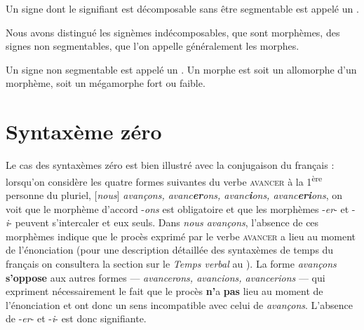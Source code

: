{Un signe dont le signifiant est décomposable sans être segmentable est appelé un .}

Nous avons distingué les signèmes indécomposables, que sont morphèmes, des signes non segmentables, que l'on appelle généralement les morphes.

{Un signe non segmentable est appelé un . Un morphe est soit un allomorphe d'un morphème, soit un mégamorphe fort ou faible.}




\section{Syntaxème zéro}\label{sec:2.2.24}

Le cas des syntaxèmes zéro est bien illustré avec la conjugaison du français : lorsqu’on considère les quatre formes suivantes du verbe \textsc{avancer} à la 1\textsuperscript{ère} personne du pluriel, [\textit{nous}] \textit{avançons, avanc}\textbf{\textit{er}}\textit{ons, avanc}\textbf{\textit{i}}\textit{ons, avanc}\textbf{\textit{eri}}\textit{ons}, on voit que le morphème d’accord -\textit{ons} est obligatoire et que les morphèmes \mbox{-\textit{er}-} et  \mbox{-\textit{i}-} peuvent s’intercaler et eux seuls. Dans \textit{nous avançons}, l’absence de ces morphèmes indique que le procès exprimé par le verbe \textsc{avancer} a lieu au moment de l’énonciation (pour une description détaillée des syntaxèmes de temps du français on consultera la section sur le \textit{Temps verbal} au ). La forme \textit{avançons} \textbf{s’oppose} aux autres formes — \textit{avancerons, avancions, avancerions} — qui expriment nécessairement le fait que le procès \textbf{n’}a \textbf{pas} lieu au moment de l’énonciation et ont donc un sens incompatible avec celui de \textit{avançons}. L’absence de -\textit{er}{}- et -\textit{i}{}- est donc signifiante.

